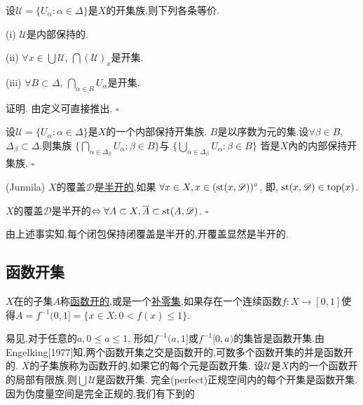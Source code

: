 \documentclass[main.tex]{subfiles}
\begin{document}
\begin{fact}
设$\mathscr{U}=\{U_\alpha:\alpha\in\Delta\}$是$X$的开集族,则下列各条等价.

\textnormal{(i)} $\mathscr{U}$是内部保持的.

\textnormal{(ii)} $\forall x\in\bigcup\mathscr{U}$, $\bigcap(\mathscr{U})_x$是开集.

\textnormal{(iii)} $\forall B\subset\Delta$, $\bigcap_{\alpha\in B}U_\alpha$是开集.
\end{fact}
证明. 由定义可直接推出. $\square$

\begin{fact}
设$\mathscr{U}=\{U_\alpha:\alpha\in\Delta\}$是$X$的一个内部保持开集族.
$B$是以序数为元的集.设$\forall \beta\in B$, $\Delta_\beta\subset \Delta$.则集族
$\{\bigcap_{\alpha\in\Delta_\beta}U_\alpha: \beta\in B\}$与
$\{\bigcup_{\alpha\in\Delta_\beta}U_\alpha: \beta\in B\}$
皆是$X$內的内部保持开集族. $\square$
\end{fact}

\begin{definition}
\textnormal{(Junnila)} $X$的覆盖$\mathscr{D}$是\underline{半开的},如果
$\forall x\in X, x\in(\textnormal{st}(x, \mathscr{D}))^\circ$, 即, 
$\textnormal{st}(x, \mathscr{D})\in\textnormal{top}(x)$.
\end{definition}

\begin{fact}
$X$的覆盖$\mathscr{D}$是半开的$\Leftrightarrow \forall A\subset X, \overline{A} \subset\textnormal{st}(A, \mathscr{D})$. $\square$
\end{fact}

由上述事实知,每个闭包保持闭覆盖是半开的,开覆盖显然是半开的.


\subsection{函数开集}\label{ch1.1.4}
\begin{definition}
	$X$在的子集$A$称\underline{函数开的},或是一个\underline{补零集},如果存在一个连续函数$f:X\rightarrow [0,1]$使得$A=f^{-1}(0,1]=\{x\in X: 0<f(x)\le 1\}$.
\end{definition}

易见,对于任意的$a, 0\le a\le1$, 形如$f^{-1}(a,1]$或$f^{-1}[0,a)$的集皆是函数开集.由 Engelking[1977]知,两个函数开集之交是函数开的,可数多个函数开集的并是函数开的.
$X$的子集族称为函数开的,如果它的每个元是函数开集.
设$\mathscr{U}$是$X$内的一个函数开的局部有限族,则$\bigcup \mathscr{U}$是函数开集.
完全(perfect)正规空间内的每个开集是函数开集.因为伪度量空间是完全正规的,我们有下到的
\end{document}
